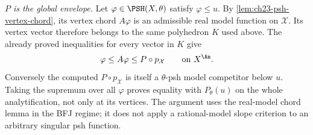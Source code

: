 \emph{\(P\) is the global envelope.}
Let \(\varphi\in\PSH(X,\theta)\) satisfy \(\varphi\leq u\).
By \cref{lem:ch23-psh-vertex-chord}, its vertex chord
\(A\varphi\) is an admissible real model function on
\(\mathcal X\).  Its vertex vector therefore belongs to the same
polyhedron \(K\) used above.  The already proved inequalities for
every vector in \(K\) give
\[
            \varphi\leq A\varphi\leq P\circ p_{\mathcal X}
            \qquad\text{on }X^{\An}.
\]
Conversely the computed \(P\circ p_{\mathcal X}\) is itself a
\(\theta\)-psh model competitor below \(u\).  Taking the supremum
over all \(\varphi\) proves equality with \(P_\theta(u)\) on the
whole analytification, not only at its vertices.  The argument uses
the real-model chord lemma in the BFJ regime; it does not apply a
rational-model slope criterion to an arbitrary singular psh function.

